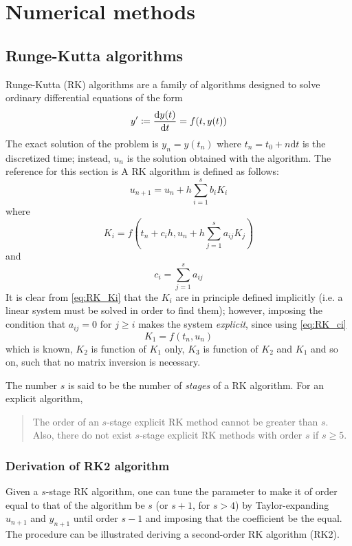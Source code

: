 \chapter{Numerical methods}
\section[Runge-Kutta]{Runge-Kutta algorithms}
Runge-Kutta (RK) algorithms are a family of algorithms designed to solve ordinary differential equations of the form
\[ y' \coloneqq \frac{\mathrm{d} y(t)}{\mathrm{d}t} = f(t,y(t)) \]
The exact solution of the problem is \(y_n=y(t_n)\) where \( t_n = t_0+n\mathrm{d}t\) is the discretized time; instead, \(u_n\) is the solution obtained with the algorithm. The reference for this section is \autocite{quarteroni2010numerical}
A RK algorithm is defined as follows: 
\[ u_{n+1} = u_n + h \sum_{i=1}^s b_i K_i\]
where
\begin{equation} \label{eq:RK_Ki} 
    K_i = f(t_n+c_i h, u_n+h \sum_{j=1}^s a_{ij} K_j)
\end{equation}
and
\begin{equation} \label{eq:RK_ci}
    c_i = \sum_{j=1}^s a_{ij} 
\end{equation}
It is clear from \autoref{eq:RK_Ki} that the $K_i$ are in principle defined implicitly (i.e. a linear system must be solved in order to find them); however, imposing the condition that \( a_{ij} = 0 \) for \( j\geq i\) makes the system \textit{explicit}, since using \autoref{eq:RK_ci}  
\[ K_1 = f(t_n,u_n) \]
which is known, $K_2$ is function of $K_1$ only, $K_3$ is function of $K_2$ and $K_1$ and so on, such that no matrix inversion is necessary.

The number $s$ is said to be the number of \textit{stages} of a RK algorithm. For an explicit algorithm, 
\begin{quotation}
The order of an $s$-stage explicit RK method cannot be greater than $s$. Also, there do not exist $s$-stage explicit RK methods with order $s$ if $s \geq 5$.
\end{quotation}


\subsection{Derivation of RK2 algorithm}
Given a $s$-stage RK algorithm, one can tune the parameter to make it of order equal to that of the algorithm be $s$ (or $s+1$, for $s>4$) by Taylor-expanding $u_{n+1}$ and $y_{n+1}$ until order $s-1$ and imposing that the coefficient be the equal. The procedure can be illustrated deriving a second-order RK algorithm (RK2).

